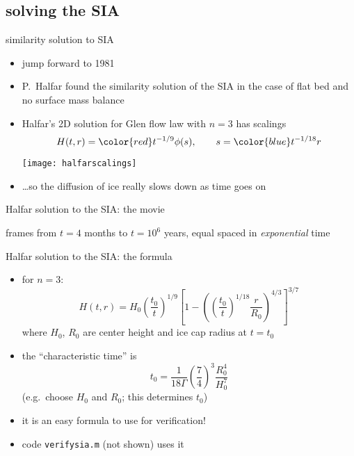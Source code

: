 \subsection{solving the SIA}

\begin{frame}{similarity solution to SIA}

\begin{itemize}
\item jump forward to 1981
\item P.~Halfar found the similarity solution of the SIA in the case of flat bed and no surface mass balance \nocite{Halfar81,Halfar83}
\item Halfar's 2D solution for Glen flow law with $n=3$ has scalings
   $$H(t,r)={\color{red} t^{-1/9}} \phi(s), \qquad s = {\color{blue} t^{-1/18}} r$$
  \begin{center}
  \texttt{[image: halfarscalings]}
  \end{center}
\item \dots so the diffusion of ice really slows down as time goes on
\end{itemize}
\end{frame}


\begin{frame}{Halfar solution to the SIA: the movie}


\par
\scriptsize 
frames from $t=4$ months to $t = 10^6$ years, equal spaced in \emph{exponential} time
\end{frame}


\begin{frame}{Halfar solution to the SIA: the formula}

\begin{itemize}
\item for $n=3$:
  $$H(t,r) = H_0 \left(\frac{t_0}{t}\right)^{1/9} \left[1 - \left(\left(\frac{t_0}{t}\right)^{1/18} \frac{r}{R_0}\right)^{4/3}\right]^{3/7}$$
where $H_0$, $R_0$ are center height and ice cap radius at $t=t_0$
\item the ``characteristic time'' is
  $$t_0 = \frac{1}{18 \Gamma} \left(\frac{7}{4}\right)^3 \frac{R_0^4}{H_0^{7}}$$
(e.g.~choose $H_0$ and $R_0$; this determines $t_0$)
\item it is an easy formula to use for verification!
\item code \texttt{verifysia.m} (not shown) uses it
\end{itemize}
\end{frame}


